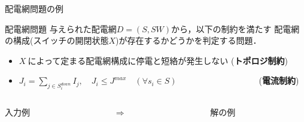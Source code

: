 \documentclass[dvipdfmx,11pt]{beamer}
\begin{document}
\begin{frame}{配電網問題の例}
 
 \begin{block}{配電網問題}
  与えられた配電網$D=(S,SW)$から，以下の制約を満たす
  配電網の構成(スイッチの開閉状態$X$)が存在するかどうかを判定する問題．
 \begin{itemize}\small
  \item $X ~\textrm{によって定まる配電網構成に停電と短絡が発生しない}$ (\textbf{トポロジ制約})
  \item $J_i = \displaystyle\sum_{j\in S_i^{down}} I_j, \quad J_i \leq J^{max} 
        \quad (\forall s_{i}\in S)\qquad\qquad\qquad\qquad\quad~~$ (\textbf{電流制約})
 \end{itemize}
 \end{block}
  \begin{columns}
    \begin{column}{0.45\textwidth}\centering
      \begin{exampleblock}{入力例}
	\centering
	\scalebox{0.3}{}
      \end{exampleblock}
    \end{column}
    \begin{column}{0.05\textwidth}\centering
      $\Rightarrow$
    \end{column}
    \begin{column}{0.45\textwidth}\centering
      \begin{exampleblock}{解の例}
        \centering
        \scalebox{0.3}{}
      \end{exampleblock}
    \end{column}
  \end{columns}
\end{frame}
\end{document}

